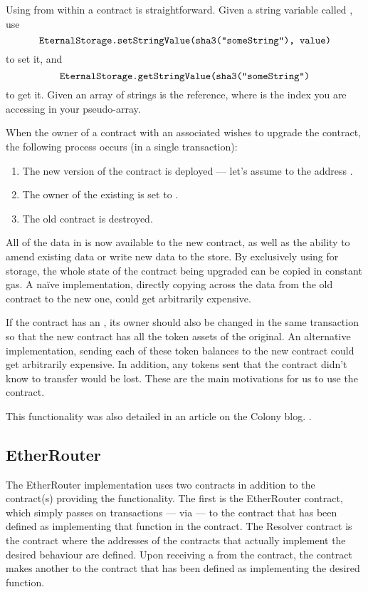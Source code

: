 Using  from within a contract is straightforward. Given a string variable called , use
\[
\texttt{EternalStorage.setStringValue(sha3("someString"), value)}
\]
to set it, and
\[
\texttt{EternalStorage.getStringValue(sha3("someString")}
\]
to get it. Given an array of strings  is the reference, where  is the index you are accessing in your pseudo-array.

When the owner of a contract with an associated  wishes to upgrade the contract, the following process occurs (in a single transaction):

\begin{enumerate}
\item The new version of the contract is deployed --- let's assume to the address .
\item The owner of the existing  is set to .
\item The old contract is destroyed.
\end{enumerate}

All of the data in  is now available to the new contract, as well as the ability to amend existing data or write new data to the store. By exclusively using  for storage, the whole state of the contract being upgraded can be copied in constant gas. A na{\"i}ve implementation, directly copying across the data from the old contract to the new one, could get arbitrarily expensive.

If the contract has an , its owner should also be changed in the same transaction so that the new contract has all the token assets of the original. An alternative implementation, sending each of these token balances to the new contract could get arbitrarily expensive. In addition, any tokens sent that the contract didn't know to transfer would be lost. These are the main motivations for us to use the  contract.

 This functionality was also detailed in an article on the Colony blog. \cite{UpgradingContracts}. 



\subsection{EtherRouter}

The EtherRouter implementation uses two contracts in addition to the contract(s) providing the functionality. The first is the EtherRouter contract, which simply passes on transactions --- via  --- to the contract that has been defined as implementing that function in the  contract. The Resolver contract is the contract where the addresses of the contracts that actually implement the desired behaviour are defined. Upon receiving a  from the  contract, the  contract makes another  to the contract that has been defined as implementing the desired function.

